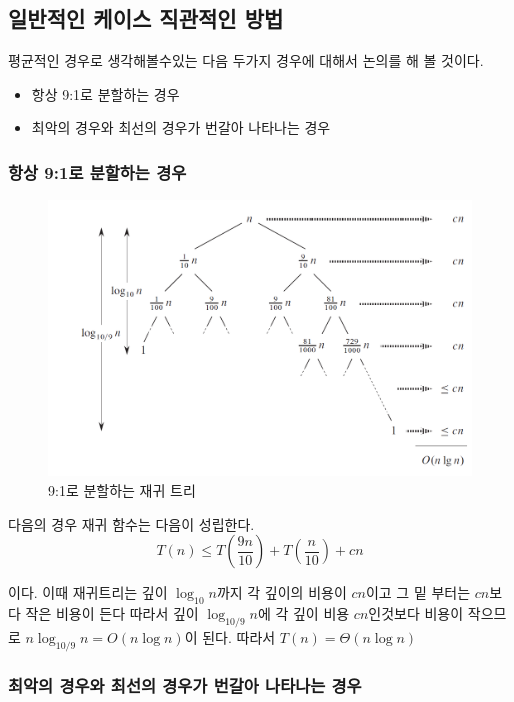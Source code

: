 \subsection{일반적인 케이스 직관적인 방법} 
평균적인 경우로 생각해볼수있는 다음 두가지 경우에 대해서 논의를 해 볼 것이다.
\begin{itemize}
    \item 항상 9:1로 분할하는 경우
    \item 최악의 경우와 최선의 경우가 번갈아 나타나는 경우
\end{itemize}

\subsubsection{항상 9:1로 분할하는 경우}

\begin{figure}[h!]
    \raggedleft
    \includegraphics[scale=0.4]{./QuickSort/pic/q9.png}
    \caption{9:1로 분할하는 재귀 트리\cite{reference1}}
\end{figure}
다음의 경우 재귀 함수는 다음이 성립한다.
$$T(n) \le T\left(\dfrac{9n}{10}\right) + T\left(\dfrac{n}{10}\right)+ cn$$


이다. 
이때 재귀트리는 깊이 $\log_{10}n$까지 각 깊이의 비용이 $cn$이고 그 밑 부터는 $cn$보다 작은 비용이 든다 따라서 깊이 $\log_{10/9}n$에 각 깊이 비용 $cn$인것보다 비용이 작으므로 $n\log_{10/9}n = O(n \log n)$이 된다. 따라서 $T(n) = \Theta(n \log n)$


\subsubsection{최악의 경우와 최선의 경우가 번갈아 나타나는 경우}


